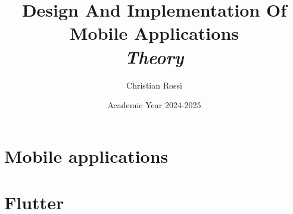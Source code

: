 \documentclass[12pt, a4paper]{report}
\title{\textbf{Design And Implementation Of Mobile Applications} \\ \textit{Theory}}
\author{Christian Rossi}
\date{Academic Year 2024-2025}
\begin{document}
    \maketitle

    

    \cleardoublepage

    \tableofcontents

    \cleardoublepage

    \chapter{Mobile applications}
    
    

    \chapter{Flutter}
    
    
    
\end{document}
